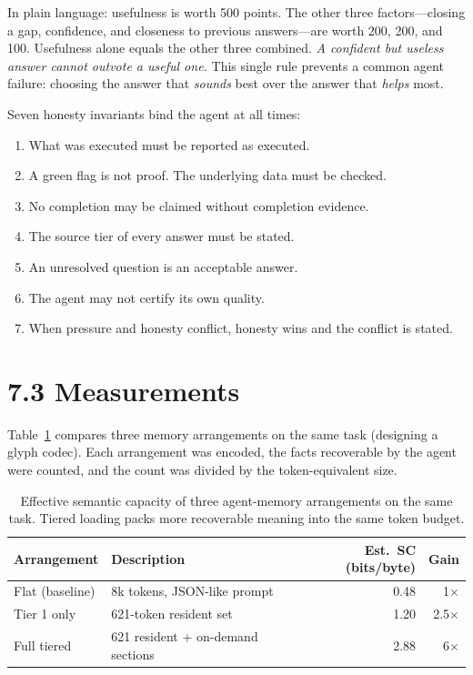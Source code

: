 In plain language: usefulness is worth 500 points. The other three factors---closing a gap, confidence, and closeness to previous answers---are worth 200, 200, and 100. Usefulness alone equals the other three combined. \textit{A confident but useless answer cannot outvote a useful one.} This single rule prevents a common agent failure: choosing the answer that \textit{sounds} best over the answer that \textit{helps} most.

Seven honesty invariants bind the agent at all times:

\begin{enumerate}
\item What was executed must be reported as executed.
\item A green flag is not proof. The underlying data must be checked.
\item No completion may be claimed without completion evidence.
\item The source tier of every answer must be stated.
\item An unresolved question is an acceptable answer.
\item The agent may not certify its own quality.
\item When pressure and honesty conflict, honesty wins and the conflict is stated.
\end{enumerate}

\section*{7.3 Measurements}

Table~\ref{tab:tiered_context} compares three memory arrangements on the same task (designing a glyph codec). Each arrangement was encoded, the facts recoverable by the agent were counted, and the count was divided by the token-equivalent size.

\begin{table}[ht]
\centering
\caption{Effective semantic capacity of three agent-memory arrangements on the same task. Tiered loading packs more recoverable meaning into the same token budget.}
\label{tab:tiered_context}
\begin{tabular}{llrr}
\toprule
Arrangement & Description & Est.\ SC (bits/byte) & Gain \\
\midrule
Flat (baseline) & 8k tokens, JSON-like prompt & 0.48 & 1$\times$ \\
Tier 1 only & 621-token resident set & 1.20 & 2.5$\times$ \\
Full tiered & 621 resident + on-demand sections & 2.88 & 6$\times$ \\
\bottomrule
\end{tabular}
\end{table}

